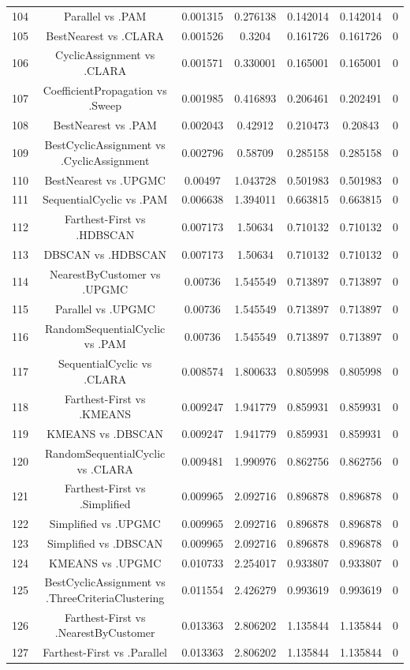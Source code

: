 \documentclass[a4paper,10pt]{article}
\begin{document}
\begin{landscape}
\begin{table}[!htp]
\begin{tabular}{ccccccc}
104&Parallel vs .PAM&0.001315&0.276138&0.142014&0.142014&0\\
105&BestNearest vs .CLARA&0.001526&0.3204&0.161726&0.161726&0\\
106&CyclicAssignment vs .CLARA&0.001571&0.330001&0.165001&0.165001&0\\
107&CoefficientPropagation vs .Sweep&0.001985&0.416893&0.206461&0.202491&0\\
108&BestNearest vs .PAM&0.002043&0.42912&0.210473&0.20843&0\\
109&BestCyclicAssignment vs .CyclicAssignment&0.002796&0.58709&0.285158&0.285158&0\\
110&BestNearest vs .UPGMC&0.00497&1.043728&0.501983&0.501983&0\\
111&SequentialCyclic vs .PAM&0.006638&1.394011&0.663815&0.663815&0\\
112&Farthest-First vs .HDBSCAN&0.007173&1.50634&0.710132&0.710132&0\\
113&DBSCAN vs .HDBSCAN&0.007173&1.50634&0.710132&0.710132&0\\
114&NearestByCustomer vs .UPGMC&0.00736&1.545549&0.713897&0.713897&0\\
115&Parallel vs .UPGMC&0.00736&1.545549&0.713897&0.713897&0\\
116&RandomSequentialCyclic vs .PAM&0.00736&1.545549&0.713897&0.713897&0\\
117&SequentialCyclic vs .CLARA&0.008574&1.800633&0.805998&0.805998&0\\
118&Farthest-First vs .KMEANS&0.009247&1.941779&0.859931&0.859931&0\\
119&KMEANS vs .DBSCAN&0.009247&1.941779&0.859931&0.859931&0\\
120&RandomSequentialCyclic vs .CLARA&0.009481&1.990976&0.862756&0.862756&0\\
121&Farthest-First vs .Simplified&0.009965&2.092716&0.896878&0.896878&0\\
122&Simplified vs .UPGMC&0.009965&2.092716&0.896878&0.896878&0\\
123&Simplified vs .DBSCAN&0.009965&2.092716&0.896878&0.896878&0\\
124&KMEANS vs .UPGMC&0.010733&2.254017&0.933807&0.933807&0\\
125&BestCyclicAssignment vs .ThreeCriteriaClustering&0.011554&2.426279&0.993619&0.993619&0\\
126&Farthest-First vs .NearestByCustomer&0.013363&2.806202&1.135844&1.135844&0\\
127&Farthest-First vs .Parallel&0.013363&2.806202&1.135844&1.135844&0\\

\end{tabular}
\end{table}
\end{landscape}
\end{document}
